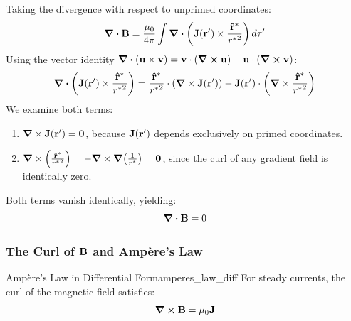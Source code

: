 \begin{proofbox}
Taking the divergence with respect to unprimed coordinates:
\begin{equation}
    \div\vb{B} = \frac{\mu_0}{4\pi} \int \div\qty(\vb{J}(\vb{r}') \times \frac{\vu{r}^*}{{r^*}^2})\,d\tau'
\end{equation}
Using the vector identity $\div(\vb{u} \times \vb{v}) = \vb{v} \cdot (\curl\vb{u}) - \vb{u} \cdot (\curl\vb{v})$:
\begin{equation}
    \div\qty(\vb{J}(\vb{r}') \times \frac{\vu{r}^*}{{r^*}^2}) = \frac{\vu{r}^*}{{r^*}^2} \cdot \qty(\grad \times \vb{J}(\vb{r}')) - \vb{J}(\vb{r}') \cdot \qty(\grad \times \frac{\vu{r}^*}{{r^*}^2})
\end{equation}
We examine both terms:
\begin{enumerate}
    \item $\grad \times \vb{J}(\vb{r}') = \vb{0}$, because $\vb{J}(\vb{r}')$ depends exclusively on primed coordinates.
    \item $\grad \times \qty(\frac{\vu{r}^*}{{r^*}^2}) = -\grad \times \grad\qty(\frac{1}{r^*}) = \vb{0}$, since the curl of any gradient field is identically zero.
\end{enumerate}
Both terms vanish identically, yielding:
\begin{equation}
    \div\vb{B} = 0
\end{equation}
\end{proofbox}

\subsubsection{The Curl of $\vb{B}$ and Ampère's Law}

\begin{theorem}{Ampère's Law in Differential Form}{amperes_law_diff}
For steady currents, the curl of the magnetic field satisfies:
\begin{equation}
    \curl\vb{B} = \mu_0 \vb{J}
\end{equation}
\end{theorem}

